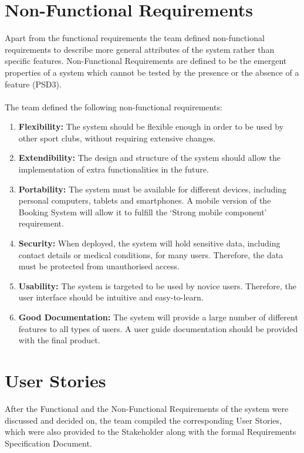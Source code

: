 \documentclass{l3proj}
\begin{document}
\section{Non-Functional Requirements}
\par
Apart from the functional requirements the team defined non-functional requirements to describe more general attributes of the system rather than specific features. Non-Functional Requirements are defined to be the emergent properties of a system which cannot be tested by the presence or the absence of a feature (PSD3). \\
\\
The team defined the following non-functional requirements:
\begin{enumerate}
	\item \textbf{Flexibility:} The system should be flexible enough in order to be used by other sport clubs, without requiring extensive changes.
	\item \textbf{Extendibility:} The design and structure of the system should allow the implementation of extra functionalities in the future.
	\item \textbf{Portability:} The system must be available for different devices, including personal computers, tablets and smartphones. A mobile version of the Booking System will allow it to fulfill the `Strong mobile component' requirement.
	\item \textbf{Security:} When deployed, the system will hold sensitive data, including contact details or medical conditions, for many users. Therefore, the data must be protected from unauthorised access.
	\item \textbf{Usability:} The system is targeted to be used by novice users. Therefore, the user interface should be intuitive and easy-to-learn.
	\item \textbf{Good Documentation:} The system will provide a large number of different features to all types of users. A user guide documentation should be provided with the final product.
\end{enumerate}

\section{User Stories}
\par
After the Functional and the Non-Functional Requirements of the system were discussed and decided on, the team compiled the corresponding User Stories, which were also provided to the Stakeholder along with the formal Requirements Specification Document.
\end{document}

